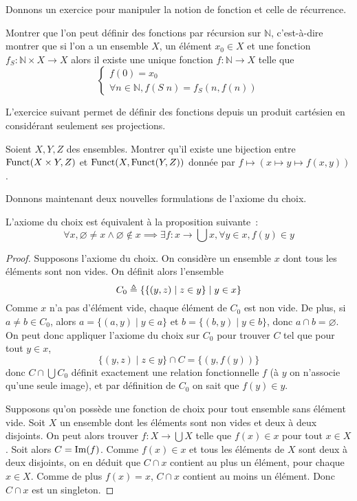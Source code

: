 Donnons un exercice pour manipuler la notion de fonction et celle de récurrence.

\begin{exercise}
  Montrer que l'on peut définir des fonctions par récursion sur $\mathbb N$,
  c'est-à-dire montrer que si l'on a un ensemble $X$, un élément $x_0\in X$ et
  une fonction $f_S : \mathbb N \times X \to X$ alors il existe une unique
  fonction $f : \mathbb N \to X$ telle que
  \[\begin{cases}
  f(0) = x_0\\
  \forall n \in \mathbb N, f(S\;n) = f_S(n,f(n))
  \end{cases}\]
\end{exercise}

L'exercice suivant permet de définir des fonctions depuis un produit cartésien
en considérant seulement ses projections.

\begin{exercise}
  Soient $X,Y,Z$ des ensembles. Montrer qu'il existe une bijection entre
  $\operatorname{Funct}(X\times Y,Z)$ et $\operatorname{Funct}(X,\operatorname{Funct}(Y,Z))$ donnée par
  $f\mapsto (x\mapsto y \mapsto f(x,y))$.
\end{exercise}

Donnons maintenant deux nouvelles formulations de l'axiome du choix.

\begin{proposition}
  L'axiome du choix est équivalent à la proposition suivante~:
  \[\forall x, \varnothing\neq x \land \varnothing\notin x \implies
  \exists f : x \to \bigcup x, \forall y \in x, f(y) \in y\]
\end{proposition}

\begin{proof}
  Supposons l'axiome du choix. On considère un ensemble $x$ dont tous les
  éléments sont non vides. On définit alors l'ensemble
  \[C_0\triangleq \{\{(y,z)\mid z \in y\}\mid y \in x\}\]
  Comme $x$ n'a pas d'élément vide, chaque élément de $C_0$ est non vide. De
  plus, si $a \neq b \in C_0$, alors
  $a = \{(a,y)\mid y \in a\}$ et $b = \{(b,y)\mid y \in b\}$, donc
  $a\cap b = \varnothing$. On peut donc appliquer l'axiome du choix sur
  $C_0$ pour trouver $C$ tel que pour tout $y\in x$,
  \[\{(y,z)\mid z \in y\}\cap C = \{(y,f(y))\}\]
  donc $C\cap \bigcup C_0$ définit exactement une relation fonctionnelle $f$
  (à $y$ on n'associe qu'une seule image), et par définition de $C_0$ on sait
  que $f(y)\in y$.

  Supposons qu'on possède une fonction de choix pour tout ensemble sans élément
  vide. Soit $X$ un ensemble dont les éléments sont non vides et deux à deux
  disjoints. On peut alors trouver $f : X \to \bigcup X$ telle que $f(x)\in x$
  pour tout $x\in X$. Soit alors $C = \operatorname{Im}(f)$. Comme $f(x)\in x$ et tous les
  éléments de $X$ sont deux à deux disjoints, on en déduit que $C\cap x$
  contient au plus un élément, pour chaque $x\in X$. Comme de plus
  $f(x) = x$, $C\cap x$ contient au moins un élément. Donc $C\cap x$ est un
  singleton.
\end{proof}

